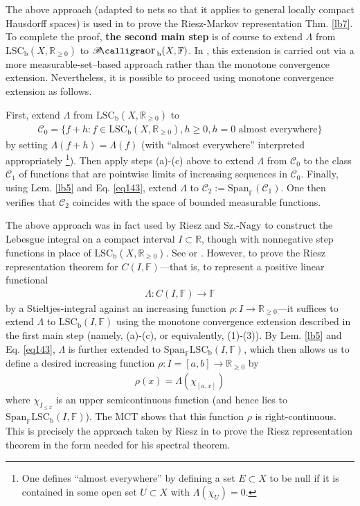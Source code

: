 \documentclass[12pt,b5paper,notitlepage]{article}
\theoremstyle{definition}
\theoremstyle{plain}
\DeclareMathOperator{\Borb}{{\mathscr{B}\text{\kern -2pt {\calligra\large or}}\,}_{\mathrm b}}
\newcommand{\Span}{\mathrm{Span}}
\newcommand{\scr}{\mathscr}
\newcommand{\Rbb}{\mathbb R}
\newcommand{\Fbb}{\mathbb F}
\newcommand{\LSCb}{\mathrm{LSC}_{\mathrm b}}
\numberwithin{equation}{section}
\begin{document}
The above approach (adapted to nets so that it applies to general locally compact Hausdorff spaces) is used in \cite[Ch. 25]{Gui-A} to prove the Riesz-Markov representation Thm. \ref{lb7}. To complete the proof, \textbf{the second main step} is of course to extend $\Lambda$ from $\LSCb(X,\Rbb_{\geq0})$ to $\Borb(X,\Fbb)$. In \cite{Gui-A}, this extension is carried out via a more measurable-set--based approach rather than the monotone convergence extension. Nevertheless, it is possible to proceed using monotone convergence extension as follows. 

First, extend $\Lambda$ from $\LSCb(X,\Rbb_{\geq0})$ to
\begin{align*}
\scr C_0=\{f+h:f\in\LSCb(X,\Rbb_{\geq0}),h\geq0,h=0\text{ almost everywhere}\}
\end{align*}
by setting $\Lambda(f+h)=\Lambda(f)$ (with ``almost everywhere'' interpreted appropriately \footnote{One defines ``almost everywhere'' by defining a set $E\subset X$ to be null if it is contained in some open set $U\subset X$ with $\Lambda(\chi_U)=0$.}). Then apply steps (a)-(c) above to extend $\Lambda$ from $\scr C_0$ to the class $\scr C_1$ of functions that are pointwise limits of increasing sequences in $\scr C_0$. Finally, using Lem. \ref{lb5} and Eq. \eqref{eq143}, extend $\Lambda$ to $\scr C_2:=\Span_\Fbb(\scr C_1)$. One then verifies that $\scr C_2$ coincides with the space of bounded measurable functions. 


The above approach was in fact used by Riesz and Sz.-Nagy to construct the Lebesgue integral on a compact interval $I\subset\Rbb$, though with nonnegative step functions in place of $\LSCb(X,\Rbb_{\geq0})$. See \cite[Sec. 16-22]{RN} or \cite[Ch. 10]{Apo}. However, to prove the Riesz representation theorem for $C(I,\Fbb)$---that is, to represent a positive linear functional
\begin{align*}
\Lambda:C(I,\Fbb)\rightarrow\Fbb
\end{align*}
by a Stieltjes-integral against an increasing function $\rho:I\rightarrow\Rbb_{\geq0}$---it suffices to extend $\Lambda$ to $\LSCb(I,\Fbb)$ using the monotone convergence extension described in the first main step (namely, (a)-(c), or equivalently, (1)-(3)). By Lem. \ref{lb5} and Eq. \eqref{eq143}, $\Lambda$ is further extended to $\Span_\Fbb\LSCb(I,\Fbb)$, which then allows us to define a desired increasing function $\rho:I=[a,b]\rightarrow\Rbb_{\geq0}$ by
\begin{align*}
\rho(x)=\Lambda(\chi_{[a,x]})
\end{align*}
where $\chi_{I_{\leq x}}$ is an upper semicontinuous function (and hence lies to $\Span_\Fbb\LSCb(I,\Fbb)$). The MCT shows that this function $\rho$ is right-continuous. This is precisely the approach taken by Riesz in \cite{Rie13} to prove the Riesz representation theorem in the form needed for his spectral theorem.
\end{document}
